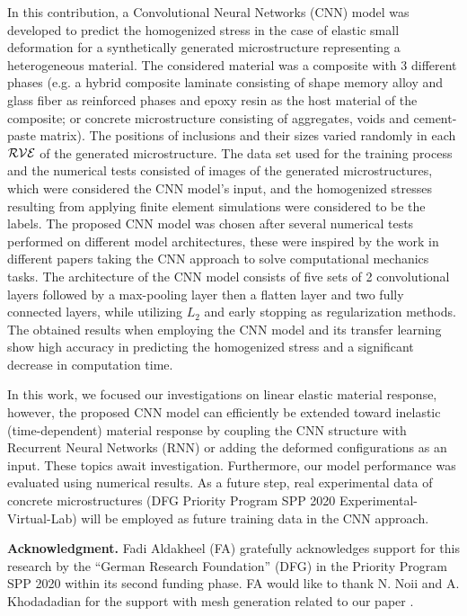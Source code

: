 \documentclass[final,3p,times]{elsarticle}
\begin{document}
In this contribution, a Convolutional Neural Networks (CNN) model was developed to predict the homogenized stress in the case of elastic small deformation for a synthetically generated microstructure representing a heterogeneous material. 
%
The considered material was a composite with 3 different phases (e.g. a hybrid composite laminate consisting of shape memory alloy and glass fiber as reinforced phases and epoxy resin as the host material of the composite; or concrete microstructure consisting of aggregates, voids and cement-paste matrix). The positions of inclusions and their sizes varied randomly in each $\cal{RVE}$ of the generated microstructure. 
%
The data set used for the training process and the numerical tests consisted of images of the generated microstructures, which were considered the CNN model's input, and the homogenized stresses resulting from applying finite element simulations were considered to be the labels. 
%
The proposed CNN model was chosen after several numerical tests performed on different model architectures, these were inspired by the work in different papers taking the CNN approach to solve computational mechanics tasks. The architecture of the CNN model consists of five sets of 2 convolutional layers followed by a max-pooling layer then a flatten layer and two fully connected layers, while utilizing $L_2$ and early stopping as regularization methods. The obtained results when employing the CNN model and its transfer learning show high accuracy in predicting the homogenized stress and a significant decrease in computation time. 


In this work, we focused our investigations on linear elastic material response, however, the proposed CNN model can efficiently be extended toward inelastic (time-dependent) material response by coupling the CNN structure with Recurrent Neural Networks (RNN) or adding the deformed configurations as an input. These topics await investigation. Furthermore, our model performance was evaluated using numerical results. As a future step, real experimental data of concrete microstructures (DFG Priority Program SPP 2020 Experimental-Virtual-Lab) will be employed as future training data in the CNN approach.



\smallskip
\smallskip

{\bf Acknowledgment.}
%
{Fadi Aldakheel} (FA) gratefully acknowledges support for this research by the ``German Research Foundation'' (DFG) in the {\sc Priority Program SPP 2020} within its second funding phase. FA would like to thank N. Noii and A. Khodadadian for the support with mesh generation related to our paper \cite{noii2022probabilistic}.



%
%


\end{document}
